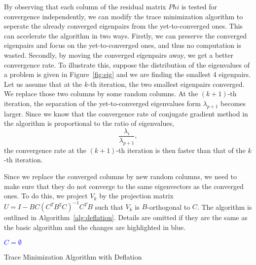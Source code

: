 By observing that each column of the residual matrix $Phi$ is tested for convergence independently, we can modify
the trace minimization algorithm to seperate the already converged eigenpairs from the yet-to-converged ones. This
can accelerate the algorithm in two ways. Firstly, we can preserve the converged eigenpairs and focus on the
yet-to-converged ones, and thus no computation is wasted. Secondly, by moving the converged eigenpairs away, we get
a better convergence rate. To illustrate this, suppose the distribution of the eigenvalues of a problem is given in
Figure~\ref{fig:eig} and we are finding the smallest 4 eigenpairs. Let us assume that at the $k$-th iteration, the
two smallest eigenpairs converged. We replace those two columns by some random columns. At the $(k + 1)$-th
iteration, the separation of the yet-to-converged eigenvalues form $\lambda_{p+1}$ becomes larger. Since we know
that the convergence rate of conjugate gradient method in the algorithm is proportional to the ratio of eigenvalues,
\begin{equation}
	\frac{\lambda_i}{\lambda_{p+1}},
\end{equation}
the convergence rate at the $(k + 1)$-th iteration is then faster than that of the $k$-th iteration.

Since we replace the converged columns by new random columns, we need to make sure that they do not converge to the
same eigenvectors as the converged ones. To do this, we project $V_k$ by the projection matrix
$U = I - B C \left(C^T B^2 C\right)^{-1}C^T B$ such that $V_k$ is $B$-orthogonal to $C$. The algorithm is outlined
in Algorithm~\ref{alg:deflation}. Details are omitted if they are the same as the basic algorithm and the changes are
highlighted in blue.

\begin{algorithm}[!h]
	\SetArgSty{}
	\textcolor{blue}{$C = \emptyset$\;}
	\caption{Trace Minimization Algorithm with Deflation}\label{alg:deflation}
\end{algorithm}

